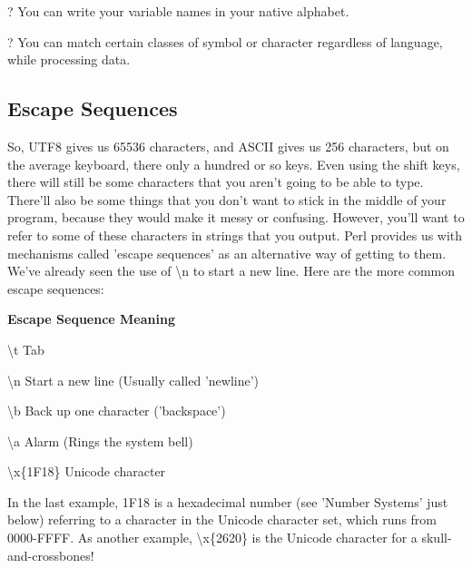 \documentclass[a4paper,11pt]{book}
\begin{document}
\noindent 

\noindent ? You can write your variable names in your native alphabet.

\noindent 

\noindent ? You can match certain classes of symbol or character regardless of language, while processing data.

\noindent 

\subsection{Escape Sequences}

\noindent 

\noindent So, UTF8 gives us 65536 characters, and ASCII gives us 256 characters, but on the average keyboard, there only a hundred or so keys. Even using the shift keys, there will still be some characters that you aren't going to be able to type. There'll also be some things that you don't want to stick in the middle of your program, because they would make it messy or confusing. However, you'll want to refer to some of these characters in strings that you output. Perl provides us with mechanisms called 'escape sequences' as an alternative way of getting to them. We've already seen the use of \textbackslash n to start a new line. Here are the more common escape sequences:

\noindent 

\noindent \textbf{Escape Sequence Meaning}

\noindent 

\noindent \textbackslash t Tab

\noindent 

\noindent \textbackslash n Start a new line (Usually called 'newline')

\noindent 

\noindent \textbackslash b Back up one character ('backspace')

\noindent 

\noindent \textbackslash a Alarm (Rings the system bell)

\noindent 

\noindent \textbackslash x\{1F18\} Unicode character

\noindent

\noindent

\noindent In the last example, 1F18 is a hexadecimal number (see 'Number Systems' just below) referring to a character in the Unicode character set, which runs from 0000-FFFF. As another example, \textbackslash x\{2620\} is the Unicode character for a skull-and-crossbones!
\end{document}
